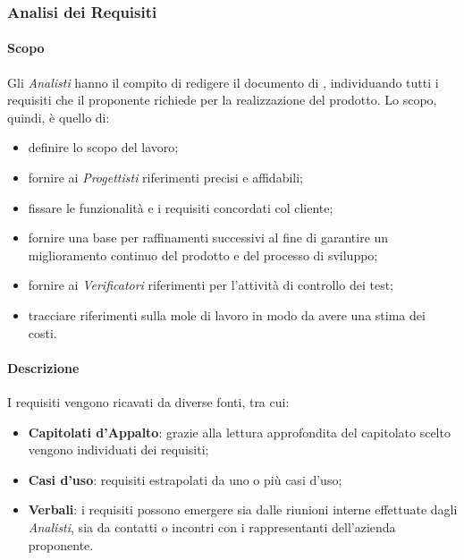\subsubsection{Analisi dei Requisiti}

\paragraph{Scopo}

Gli \textit{Analisti} hanno il compito di redigere il documento di \AdR, individuando tutti i requisiti che il proponente richiede per la realizzazione del prodotto.  Lo scopo,  quindi,  è quello di:
\begin{itemize}

\item definire lo scopo del lavoro;

\item fornire ai \textit{Progettisti} riferimenti precisi e affidabili;

\item fissare le funzionalità e i requisiti concordati col cliente;

\item fornire una base per raffinamenti successivi al fine di garantire un miglioramento continuo del prodotto e del processo di sviluppo;

\item fornire ai \textit{Verificatori} riferimenti per l'attività di controllo dei test;

\item tracciare riferimenti sulla mole di lavoro in modo da avere una stima dei costi.

\end{itemize}

\paragraph{Descrizione}

I requisiti vengono ricavati da diverse fonti,  tra cui:
\begin{itemize}

\item \textbf{Capitolati d'Appalto}: grazie alla lettura approfondita del capitolato scelto vengono individuati dei requisiti;

\item \textbf{Casi d'uso}: requisiti estrapolati da uno o più casi d'uso; 

\item \textbf{Verbali}: i requisiti possono emergere sia dalle riunioni interne effettuate dagli \textit{Analisti},  sia da contatti o incontri con i rappresentanti dell'azienda proponente.

\end{itemize}

